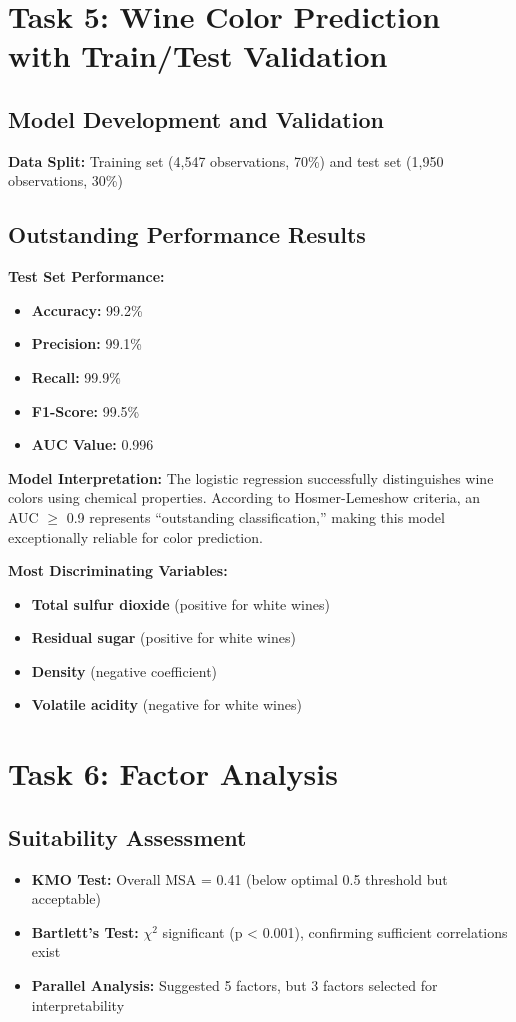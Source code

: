 \section{Task 5: Wine Color Prediction with Train/Test Validation}

\subsection{Model Development and Validation}
\textbf{Data Split:} Training set (4,547 observations, 70\%) and test set (1,950 observations, 30\%)

\subsection{Outstanding Performance Results}
\textbf{Test Set Performance:}
\begin{itemize}
\item \textbf{Accuracy:} 99.2\%
\item \textbf{Precision:} 99.1\%
\item \textbf{Recall:} 99.9\%
\item \textbf{F1-Score:} 99.5\%
\item \textbf{AUC Value:} 0.996
\end{itemize}

\textbf{Model Interpretation:} The logistic regression successfully distinguishes wine colors using chemical properties. According to Hosmer-Lemeshow criteria, an AUC $\geq$ 0.9 represents ``outstanding classification,'' making this model exceptionally reliable for color prediction.

\textbf{Most Discriminating Variables:}
\begin{itemize}
\item \textbf{Total sulfur dioxide} (positive for white wines)
\item \textbf{Residual sugar} (positive for white wines)
\item \textbf{Density} (negative coefficient)
\item \textbf{Volatile acidity} (negative for white wines)
\end{itemize}

\section{Task 6: Factor Analysis}

\subsection{Suitability Assessment}
\begin{itemize}
\item \textbf{KMO Test:} Overall MSA = 0.41 (below optimal 0.5 threshold but acceptable)
\item \textbf{Bartlett's Test:} $\chi^2$ significant (p < 0.001), confirming sufficient correlations exist
\item \textbf{Parallel Analysis:} Suggested 5 factors, but 3 factors selected for interpretability
\end{itemize}

